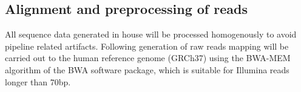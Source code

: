 \subsection{Alignment and preprocessing of reads}
All sequence data generated in house will be processed homogenously to avoid pipeline related artifacts. Following generation of raw reads mapping will be carried out to the human reference genome (GRCh37) using the BWA-MEM algorithm of the BWA software package, which is suitable for Illumina reads longer than 70bp.\cite{2013arXiv1303.3997L}